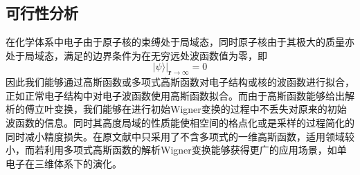 \subsection{可行性分析}
在化学体系中电子由于原子核的束缚处于局域态，同时原子核由于其极大的质量亦处于局域态，满足的边界条件为在无穷远处波函数值为零，即
\begin{equation}
	| \psi \rangle \big|_{\boldsymbol{r}\rightarrow \infty} = 0
\end{equation} 
因此我们能够通过高斯函数或多项式高斯函数对电子结构或核的波函数进行拟合，正如正常电子结构中对电子波函数使用高斯函数拟合。而由于高斯函数能够给出解析的傅立叶变换，我们能够在进行初始Wigner变换的过程中不丢失对原来的初始波函数的信息。同时其高度局域的性质能使相空间的格点化或是采样的过程简化的同时减小精度损失。在原文献中\cite{LinjunSemiclassical}只采用了不含多项式的一维高斯函数，适用领域较小，而若利用多项式高斯函数的解析Wigner变换能够获得更广的应用场景，如单电子在三维体系下的演化。



